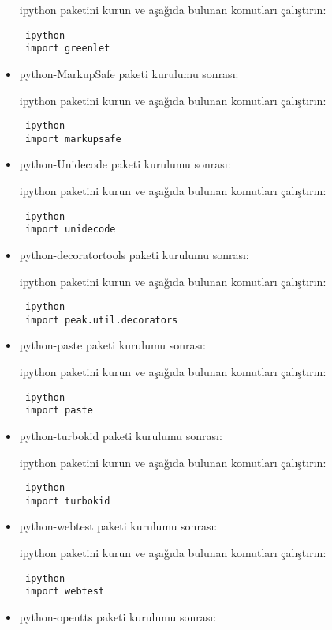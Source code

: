 \documentclass[a4paper,10pt]{article}
\begin{document}
\begin{itemize}
ipython paketini kurun ve aşağıda bulunan komutları çalıştırın:
\begin{verbatim}
 ipython
 import greenlet
\end{verbatim}

\item python-MarkupSafe paketi kurulumu sonrası:

ipython paketini kurun ve aşağıda bulunan komutları çalıştırın:
\begin{verbatim}
 ipython
 import markupsafe
\end{verbatim}

\item python-Unidecode paketi kurulumu sonrası:

ipython paketini kurun ve aşağıda bulunan komutları çalıştırın:
\begin{verbatim}
 ipython
 import unidecode
\end{verbatim}

\item python-decoratortools paketi kurulumu sonrası:

ipython paketini kurun ve aşağıda bulunan komutları çalıştırın:
\begin{verbatim}
 ipython
 import peak.util.decorators
\end{verbatim}

\item python-paste paketi kurulumu sonrası:

ipython paketini kurun ve aşağıda bulunan komutları çalıştırın:
\begin{verbatim}
 ipython
 import paste
\end{verbatim}

\item python-turbokid paketi kurulumu sonrası:

ipython paketini kurun ve aşağıda bulunan komutları çalıştırın:
\begin{verbatim}
 ipython
 import turbokid
\end{verbatim}

\item python-webtest paketi kurulumu sonrası:

ipython paketini kurun ve aşağıda bulunan komutları çalıştırın:
\begin{verbatim}
 ipython
 import webtest
\end{verbatim}


\item python-opentts paketi kurulumu sonrası:


\end{itemize}
\end{document}
